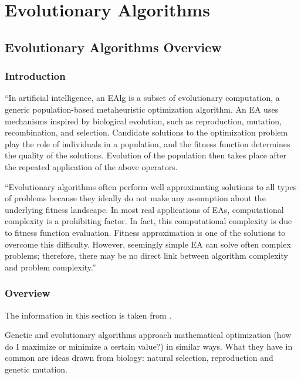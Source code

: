 

\part{Evolutionary Algorithms}

\chapter{Evolutionary Algorithms Overview}
\label{chap:EvolAlgoOverview}


\section{Introduction}

``In artificial intelligence, an \ac{EAlg} is a subset of evolutionary computation, a generic population-based metaheuristic optimization algorithm. An EA uses mechanisms inspired by biological evolution, such as reproduction, mutation, recombination, and selection. Candidate solutions to the optimization problem play the role of individuals in a population, and the fitness function determines the quality of the solutions. Evolution of the population then takes place after the repeated application of the above operators.

``Evolutionary algorithms often perform well approximating solutions to all types of problems because they ideally do not make any assumption about the underlying fitness landscape.  In most real applications of EAs, computational complexity is a prohibiting factor. In fact, this computational complexity is due to fitness function evaluation. Fitness approximation is one of the solutions to overcome this difficulty. However, seemingly simple EA can solve often complex problems; therefore, there may be no direct link between algorithm complexity and problem complexity.''\cite{WikipeadiaEvolutionaryAlgo2019}

\section{Overview}

The information in this section is taken from \cite{DevinSoni2018,skymind2019}.

Genetic and evolutionary algorithms approach mathematical optimization (how do I maximize or minimize a certain value?) in similar ways. What they have in common are ideas drawn from biology: natural selection, reproduction and genetic mutation.

